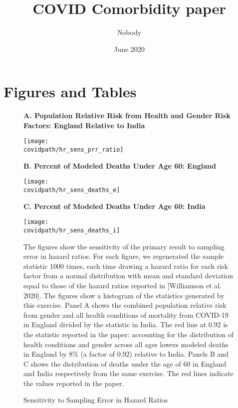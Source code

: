 \documentclass[12pt,letterpaper]{article}
\title{COVID Comorbidity paper} \author{Nobody}
\numberwithin{equation}{section}
\begin{document}
\date{June 2020}

  \section{Figures and Tables}
 
  \begin{figure}[H]
    \begin{center}
      \caption{Sensitivity to Sampling Error in Hazard Ratios}
      
      \footnotesize{\textbf{A. Population Relative Risk from Health and Gender Risk
        Factors: \newline England Relative to India}}
      
      \texttt{[image: \\covidpath/hr\_sens\_prr\_ratio]}

      \newline
      
      \footnotesize{\textbf{B. Percent of Modeled Deaths Under Age 60: England}}
      
      \texttt{[image: \\covidpath/hr\_sens\_deaths\_e]}

      \newline
      
      \footnotesize{\textbf{C. Percent of Modeled Deaths Under Age 60: India}}
      
      \texttt{[image: \\covidpath/hr\_sens\_deaths\_i]}
    
    \end{center}
    
    \footnotesize{The figures show the sensitivity of the primary
      result to sampling error in hazard ratios. For each figure, we
      regenerated the sample statistic 1000 times, each time drawing a
      hazard ratio for each risk factor from a normal distribution
      with mean and standard deviation equal to those of the hazard
      ratios reported in [Williamson et al. 2020]. The figures show a
      histogram of the statistics generated by this exercise. Panel A
      shows the combined population relative risk from gender and all
      health conditions of mortality from COVID-19 in England divided
      by the statistic in India. The red line at 0.92 is the statistic
      reported in the paper: accounting for the distribution of health
      conditions and gender across all ages lowers modeled deaths in
      England by 8\% (a factor of 0.92) relative to India. Panels B
      and C shows the distribution of deaths under the age of 60 in
      England and India respectively from the same exercise. The red
      lines indicate the values reported in the paper.}
  \end{figure}
\end{document}

